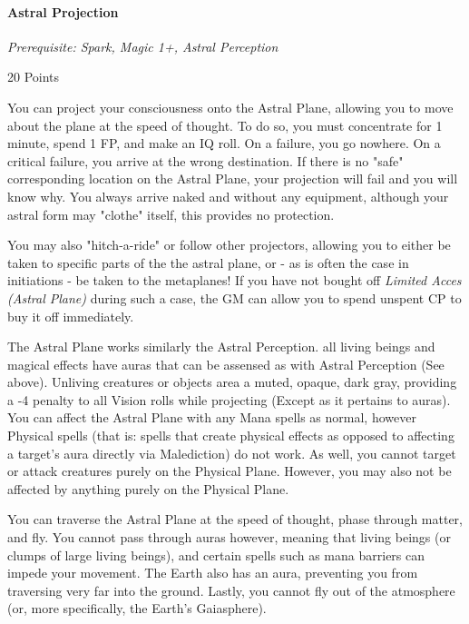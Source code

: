 \begin{multicols*}{3}
	\paragraph{Astral Projection}\label{astral_projection}
	\textit{Prerequisite: Spark, Magic 1+, Astral Perception}
	\begin{flushright}
		20 Points
	\end{flushright}
	
	You can project your consciousness onto the Astral Plane, allowing you to move about the plane at the speed of thought. To do so, you must concentrate for 1 minute, spend 1 FP, and make an IQ roll. On a failure, you go nowhere. On a critical failure, you arrive at the wrong destination. If there is no "safe" corresponding location on the Astral Plane, your projection will fail and you will know why. You always arrive naked and without any equipment, although your astral form may "clothe" itself, this provides no protection.
	
	You may also "hitch-a-ride" or follow other projectors, allowing you to either be taken to specific parts of the the astral plane, or - as is often the case in initiations - be taken to the metaplanes! If you have not bought off \textit{Limited Acces (Astral Plane)} during such a case, the GM can allow you to spend unspent CP to buy it off immediately.
	
	The Astral Plane works similarly the Astral Perception. all living beings and magical effects have auras that can be assensed as with Astral Perception (See above). Unliving creatures or objects area a muted, opaque, dark gray, providing a -4 penalty to all Vision rolls while projecting (Except as it pertains to auras). You can affect the Astral Plane with any Mana spells as normal, however Physical spells (that is: spells that create physical effects as opposed to affecting a target's aura directly via Malediction) do not work. As well, you cannot target or attack creatures purely on the Physical Plane. However, you may also not be affected by anything purely on the Physical Plane.
	
	You can traverse the Astral Plane at the speed of thought, phase through matter, and fly. You cannot pass through auras however, meaning that living beings (or clumps of large living beings), and certain spells such as mana barriers can impede your movement. The Earth also has an aura, preventing you from traversing very far into the ground. Lastly, you cannot fly out of the atmosphere (or, more specifically, the Earth's Gaiasphere).
	

\end{multicols*}
